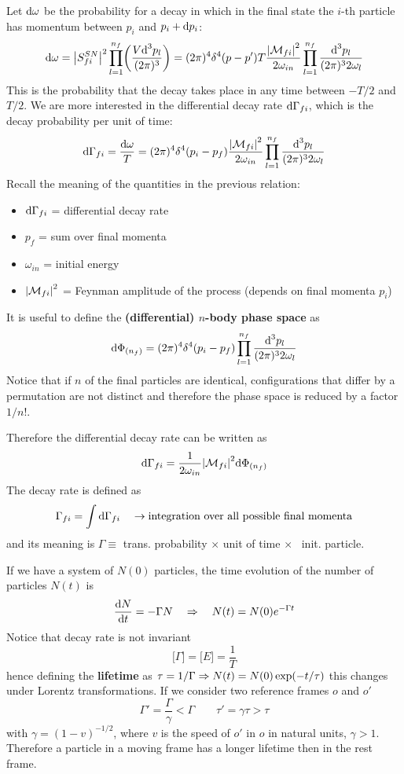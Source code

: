 \documentclass[TheoreticalPhy_ModB.tex]{subfiles}
\begin{document}
Let $\textup{d} \omega$ be the probability for a decay in which in the final state the $i$-th particle has momentum between $p_i$ and $p_i+ \textup{d} p_i$:
\[
\textup{d} \omega = \abs{S_{fi}^{SN}}^2 \prod_{l=1}^{n_f} \biggl( \frac{V\textup{d}^3 p_l}{(2 \pi)^3} \biggr)
=(2 \pi)^4 \delta^4 (p - p')T\frac {\abs{\mathcal{M}_{fi}}^2}{2 \omega_{in}} \prod_{l=1}^{n_f} \frac{\textup{d}^3 p_l}{(2 \pi)^3 2 \omega_l}
\]
This is the probability that the decay takes place in any time between $-T/2$ and $T/2$. We are more interested in the differential decay rate $\textup{d} \Gamma_{fi}$, which is the decay probability per unit of time:
\[
\textup{d} \Gamma_{fi} = \frac{\textup{d} \omega}{T} = (2 \pi)^4 \delta^4 (p_i - p_f) \frac{\abs{\mathcal{M}_{fi}}^2}{2 \omega_{in}}
	\prod_{l=1}^{n_f} \frac{\textup{d}^3 p_l}{(2 \pi)^3 2 \omega_l}
\]
Recall the meaning of the quantities in the previous relation:
\begin{itemize}[label=$\bullet$]
\item $\textup{d} \Gamma_{fi}$ = differential decay rate
\item $p_f$ = sum over final momenta
\item $\omega_{{in}}$ = initial energy
\item $\abs{\mathcal{M}_{fi}}^2$ = Feynman amplitude of the process (depends on final momenta $p_i$)
\end{itemize}
It is useful to define the \textbf{(differential) $n$-body phase space} as
\[
\textup{d} \Phi_{(n_f)} = (2 \pi)^4 \delta^4 (p_i - p_f) \prod_{l=1}^{n_f} \frac{\textup{d}^3 p_l}{(2 \pi)^3 2 \omega_l}
\]
Notice that if $n$ of the final particles are identical, configurations that differ by a permutation are not distinct and therefore the phase space is reduced by a factor $1/n!$.

Therefore the differential decay rate can be written as
\[
\textup{d} \Gamma_{fi} = \frac{1}{2 \omega_{{in}}} \abs{\mathcal{M}_{fi}}^2 \textup{d} \Phi_{(n_f)}
\]
The decay rate is defined as
\[
\Gamma_{fi} = \int \textup{d} \Gamma_{fi}
\quad
\to \textup{integration over all possible final momenta}
\]
and its meaning is $\Gamma \equiv$ trans. probability $\times$ unit of time $\times$ \ init. particle.

If we have a system of $N(0)$ particles, the time evolution of the number of particles $N(t)$ is
\[
\frac{\textup{d} N}{\textup{d} t} = - \Gamma N
\quad \Rightarrow \quad
N(t) = N(0) e^{-\Gamma t}
\]
Notice that decay rate is not invariant
\[
\bigl[ \Gamma \bigr] = \bigl[ E \bigr] = \frac{1}{T}
\]
hence defining the \textbf{lifetime} as $\tau = 1/\Gamma \Rightarrow N(t) = N(0) \exp(-t/\tau)$ this changes under Lorentz transformations. If we consider two reference frames $o$ and $o'$
\[
\Gamma' = \frac{\Gamma}{\gamma} < \Gamma
\qquad
\tau' = \gamma \tau > \tau
\]
with $\gamma = (1 - v)^{-1/2}$, where $v$ is the speed of $o'$ in $o$ in natural units, $\gamma > 1$. Therefore a particle in a moving frame has a longer lifetime then in the rest frame.
\end{document}
